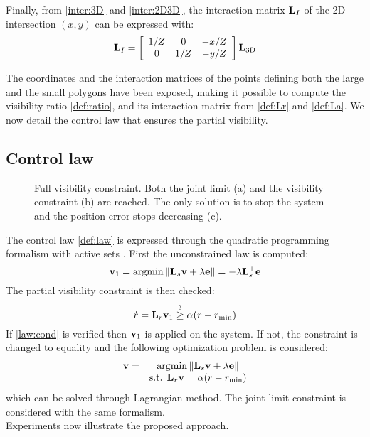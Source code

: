 \documentclass[letterpaper, 10 pt, conference]{IEEEtran}  %
\begin{document}
Finally, from \eqref{inter:3D} and \eqref{inter:2D3D}, the interaction matrix $\mathbf{L}_I$ of the 2D intersection $(x,y)$ can be expressed with:
\begin{equation}
\mathbf{L}_I = \left[\begin{array}{ccc}1/Z & 0 & -x/Z \\ 0 & 1/Z & -y/Z \end{array}\right]\mathbf{L}_{\text{3D}}
\end{equation}

The coordinates and the interaction matrices of the points defining both the large and the small polygons have been exposed, making it possible
to compute the visibility ratio \eqref{def:ratio}, and its interaction matrix from \eqref{def:Lr} and \eqref{def:La}.
We now detail the control law that ensures the partial visibility.

\subsection{Control law}

\begin{figure*}
\hfill
{}\hfill
{}
\caption{Full visibility constraint. Both the joint limit (a) and the visibility constraint (b) are reached. The only solution is to stop the system and the position error stops decreasing (c).}
\label{fig:full}
\end{figure*}

The control law \eqref{def:law} is expressed through the quadratic programming formalism with active sets \cite{kanoun2010kinematic}.
First the unconstrained law is computed:
\begin{equation}
\v_1 = \argmin \norm{\L_s\v + \lambda\e} = -\lambda\L_s^+\e
\end{equation}
The partial visibility constraint is then checked:
\begin{equation}\label{law:cond}
\dot r = \L_r\v_1\stackrel{?}{\geq} \alpha(r-r_{\text{min}})
\end{equation}
If \eqref{law:cond} is verified then $\mathbf{v}_1$ is applied on the system.
If not, the constraint is changed to equality and the following optimization problem is considered:
\begin{equation}\label{eq:law}
\begin{array}{lc} \v = & \argmin \norm{\L_s\v + \lambda\e} \\
								& \text{s.t.  }  \L_r\v = \alpha(r-r_{\text{min}})
								\end{array}
\end{equation}which can be solved through Lagrangian method.
The joint limit constraint is considered with the same formalism. \\
Experiments now illustrate the proposed approach.
\end{document}
